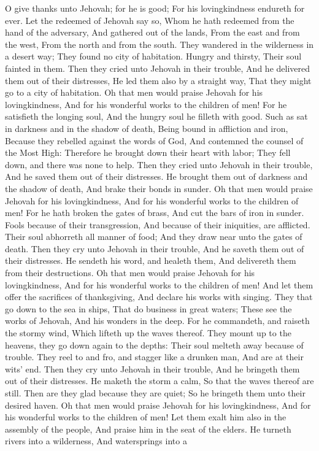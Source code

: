 O give thanks unto Jehovah; for he is good; For his lovingkindness endureth for ever.  Let the redeemed of Jehovah say so, Whom he hath redeemed from the hand of the adversary,  And gathered out of the lands, From the east and from the west, From the north and from the south.  They wandered in the wilderness in a desert way; They found no city of habitation.  Hungry and thirsty, Their soul fainted in them.  Then they cried unto Jehovah in their trouble, And he delivered them out of their distresses,  He led them also by a straight way, That they might go to a city of habitation.  Oh that men would praise Jehovah for his lovingkindness, And for his wonderful works to the children of men!  For he satisfieth the longing soul, And the hungry soul he filleth with good.  Such as sat in darkness and in the shadow of death, Being bound in affliction and iron,  Because they rebelled against the words of God, And contemned the counsel of the Most High:  Therefore he brought down their heart with labor; They fell down, and there was none to help.  Then they cried unto Jehovah in their trouble, And he saved them out of their distresses.  He brought them out of darkness and the shadow of death, And brake their bonds in sunder.  Oh that men would praise Jehovah for his lovingkindness, And for his wonderful works to the children of men!  For he hath broken the gates of brass, And cut the bars of iron in sunder.  Fools because of their transgression, And because of their iniquities, are afflicted.  Their soul abhorreth all manner of food; And they draw near unto the gates of death.  Then they cry unto Jehovah in their trouble, And he saveth them out of their distresses.  He sendeth his word, and healeth them, And delivereth them from their destructions.  Oh that men would praise Jehovah for his lovingkindness, And for his wonderful works to the children of men!  And let them offer the sacrifices of thanksgiving, And declare his works with singing.  They that go down to the sea in ships, That do business in great waters;  These see the works of Jehovah, And his wonders in the deep.  For he commandeth, and raiseth the stormy wind, Which lifteth up the waves thereof.  They mount up to the heavens, they go down again to the depths: Their soul melteth away because of trouble.  They reel to and fro, and stagger like a drunken man, And are at their wits’ end.  Then they cry unto Jehovah in their trouble, And he bringeth them out of their distresses.  He maketh the storm a calm, So that the waves thereof are still.  Then are they glad because they are quiet; So he bringeth them unto their desired haven.  Oh that men would praise Jehovah for his lovingkindness, And for his wonderful works to the children of men!  Let them exalt him also in the assembly of the people, And praise him in the seat of the elders.  He turneth rivers into a wilderness, And watersprings into a 